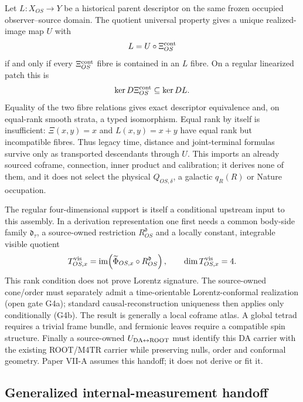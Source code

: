 \documentclass[11pt]{article}
\begin{document}
Let $L:X_{OS}\to Y$ be a historical parent descriptor on the same frozen
occupied observer--source domain.  The quotient universal property gives a
unique realized-image map $U$ with
\begin{equation}
 L=U\circ\Xi_{OS}^{\rm cont}
 \label{eq:viia-mopr-mig}
\end{equation}
if and only if every $\Xi_{OS}^{\rm cont}$ fibre is contained in an $L$
fibre.  On a regular linearized patch this is
\begin{equation}
 \ker D\Xi_{OS}^{\rm cont}\subseteq\ker DL.
 \label{eq:viia-mopr-mig-linear}
\end{equation}
Equality of the two fibre relations gives exact descriptor equivalence and,
on equal-rank smooth strata, a typed isomorphism.  Equal rank by itself is
insufficient: $\Xi(x,y)=x$ and $L(x,y)=x+y$ have equal rank but incompatible
fibres.  Thus legacy time, distance and joint-terminal formulas survive only
as transported descendants through $U$.  This imports an already sourced
coframe, connection, inner product and calibration; it derives none of them,
and it does not select the physical $Q_{OS,\delta}$, a galactic $q_R(R)$ or
Nature occupation.

The regular four-dimensional support is itself a conditional upstream input
to this assembly.  In a derivation representation one first needs a common
body-side family $\mathfrak d_\tau$, a source-owned restriction
$R^{\mathfrak d}_{OS}$ and a locally constant, integrable visible quotient
\[
 T^{\rm vis}_{OS,x}
 =\operatorname{im}\!\left(
   \widetilde\Phi_{OS,x}\circ R^{\mathfrak d}_{OS}
  \right),
 \qquad \dim T^{\rm vis}_{OS,x}=4.
\]
This rank condition does not prove Lorentz signature.  The source-owned
cone/order must separately admit a time-orientable Lorentz-conformal
realization (open gate G4a); standard causal-reconstruction uniqueness then
applies only conditionally (G4b).  The result is generally a local coframe
atlas.  A global tetrad requires a trivial frame bundle, and fermionic leaves
require a compatible spin structure.  Finally a source-owned
$U_{\rm DA\leftrightarrow ROOT}$ must identify this DA carrier with the
existing ROOT/M4TR carrier while preserving nulls, order and conformal
geometry.  Paper VII-A assumes this handoff; it does not derive or fit it.

\subsection*{Generalized internal-measurement handoff}
\end{document}
